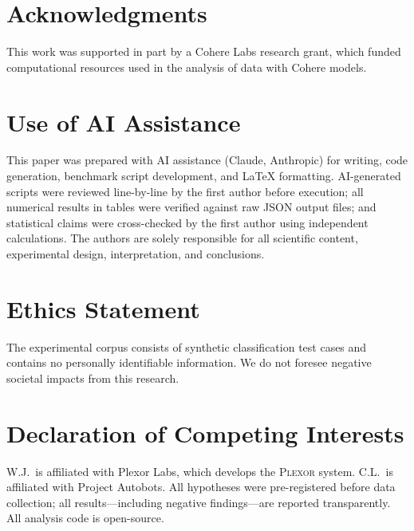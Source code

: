 \documentclass{article}
\newcommand{\plexor}{\textsc{Plexor}}
\begin{document}
\section*{Acknowledgments}

This work was supported in part by a Cohere Labs research grant, which funded computational resources used in the analysis of data with Cohere models.

\section*{Use of AI Assistance}

This paper was prepared with AI assistance (Claude, Anthropic) for writing, code generation, benchmark script development, and \LaTeX{} formatting. AI-generated scripts were reviewed line-by-line by the first author before execution; all numerical results in tables were verified against raw JSON output files; and statistical claims were cross-checked by the first author using independent calculations. The authors are solely responsible for all scientific content, experimental design, interpretation, and conclusions.

\section*{Ethics Statement}

The experimental corpus consists of synthetic classification test cases and contains no personally identifiable information. We do not foresee negative societal impacts from this research.

\section*{Declaration of Competing Interests}

W.J.\ is affiliated with Plexor Labs, which develops the \plexor{} system. C.L.\ is affiliated with Project Autobots. All hypotheses were pre-registered before data collection; all results---including negative findings---are reported transparently. All analysis code is open-source.
\end{document}
